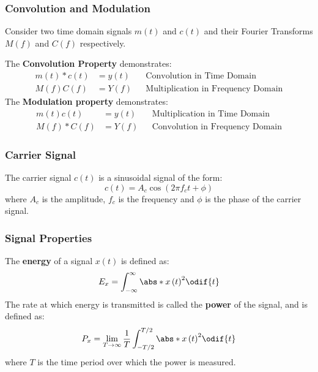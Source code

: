 \documentclass{article}
\begin{document}
\subsubsection{Convolution and Modulation}
Consider two time domain signals \(m\left( t \right)\) and \(c\left( t \right)\) and their Fourier Transforms \(M\left( f \right)\) and \(C\left( f \right)\) respectively.

The \textbf{Convolution Property} demonstrates:
\begin{align*}
    m\left( t \right) \ast c\left( t \right) & = y\left( t \right) &  & \text{Convolution in Time Domain}         \\
    M\left( f \right) C\left( f \right)      & = Y\left( f \right) &  & \text{Multiplication in Frequency Domain}
\end{align*}
The \textbf{Modulation property} demonstrates:
\begin{align*}
    m\left( t \right) c\left( t \right)      & = y\left( t \right) &  & \text{Multiplication in Time Domain}   \\
    M\left( f \right) \ast C\left( f \right) & = Y\left( f \right) &  & \text{Convolution in Frequency Domain}
\end{align*}
\subsubsection{Carrier Signal}
The carrier signal \(c\left( t \right)\) is a sinusoidal signal of the form:
\begin{equation*}
    c\left( t \right) = A_c \cos{\left( 2 \pi f_c t + \phi \right)}
\end{equation*}
where \(A_c\) is the amplitude, \(f_c\) is the frequency and \(\phi\) is the phase of the carrier signal.
\subsubsection{Signal Properties}
The \textbf{energy} of a signal \(x\left( t \right)\) is defined as:
\begin{equation*}
    E_x = \int_{-\infty}^{\infty} \abs*{x\left( t \right)}^2 \odif{t}
\end{equation*}
The rate at which energy is transmitted is called the \textbf{power} of the signal, and is defined as:
\begin{equation*}
    P_x = \lim_{T \to \infty} \frac{1}{T} \int_{-T/2}^{T/2} \abs*{x\left( t \right)}^2 \odif{t}
\end{equation*}
where \(T\) is the time period over which the power is measured.
\end{document}
